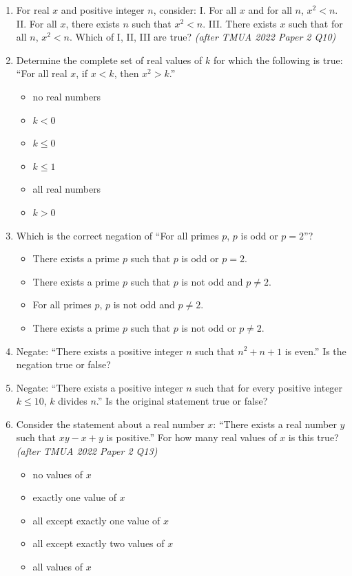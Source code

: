 \documentclass[11pt,a4paper]{article}
\begin{document}
\begin{enumerate}

\item For real $x$ and positive integer $n$, consider: I. For all $x$ and for all $n$, $x^2<n$. II. For all $x$, there exists $n$ such that $x^2<n$. III. There exists $x$ such that for all $n$, $x^2<n$. Which of I, II, III are true? \textit{\small(after TMUA 2022 Paper 2 Q10)}

\item Determine the complete set of real values of $k$ for which the following is true: ``For all real $x$, if $x<k$, then $x^2>k$.''
\begin{itemize}
\item[A)] no real numbers
\item[B)] $k<0$
\item[C)] $k\leq0$
\item[D)] $k\leq1$
\item[E)] all real numbers
\item[F)] $k>0$
\end{itemize}

\item Which is the correct negation of ``For all primes $p$, $p$ is odd or $p=2$''?
\begin{itemize}
\item[A)] There exists a prime $p$ such that $p$ is odd or $p=2$.
\item[B)] There exists a prime $p$ such that $p$ is not odd and $p\neq2$.
\item[C)] For all primes $p$, $p$ is not odd and $p\neq2$.
\item[D)] There exists a prime $p$ such that $p$ is not odd or $p\neq2$.
\end{itemize}

\item Negate: ``There exists a positive integer $n$ such that $n^2+n+1$ is even.'' Is the negation true or false?

\item Negate: ``There exists a positive integer $n$ such that for every positive integer $k\leq10$, $k$ divides $n$.'' Is the original statement true or false?

\item Consider the statement about a real number $x$: ``There exists a real number $y$ such that $xy-x+y$ is positive.'' For how many real values of $x$ is this true? \textit{\small(after TMUA 2022 Paper 2 Q13)}
\begin{itemize}
\item[A)] no values of $x$
\item[B)] exactly one value of $x$
\item[C)] all except exactly one value of $x$
\item[D)] all except exactly two values of $x$
\item[E)] all values of $x$
\end{itemize}


\end{enumerate}
\end{document}

